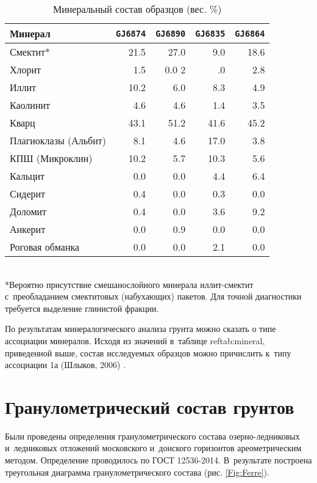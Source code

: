 \begin{table}[]
    \centering
    \small
    \caption{Минеральный состав образцов (вес. \%)} \label{tab:mineral}
    \begin{tabular}{@{}lrrrr@{}}
    \toprule
    Минерал & \texttt{GJ6874} &	\texttt{GJ6890} & \texttt{GJ6835} & \texttt{GJ6864}  \\ \midrule
    Смектит*	& 21.5	& 27.0	& 9.0	& 18.6 \\
    Хлорит	& 1.5	& 0.0	2& .0	& 2.8 \\
    Иллит	& 10.2	& 6.0	& 8.3	& 4.9 \\
    Каолинит	& 4.6	& 4.6	& 1.4	& 3.5 \\
    Кварц	& 43.1	& 51.2	& 41.6	& 45.2 \\
    Плагиоклазы (Альбит)	& 8.1	& 4.6	& 17.0	& 3.8 \\
    КПШ (Микроклин)	& 10.2	& 5.7	& 10.3	& 5.6 \\
    Кальцит	& 0.0	& 0.0	& 4.4	& 6.4 \\
    Сидерит	& 0.4	& 0.0	& 0.3	& 0.0 \\
    Доломит	& 0.4	& 0.0	& 3.6	& 9.2 \\
    Анкерит	& 0.0	& 0.9	& 0.0	& 0.0 \\
    Роговая обманка	& 0.0	& 0.0	& 2.1	& 0.0 \\ \bottomrule
    \end{tabular}
    \\ *Вероятно присутствие смешанослойного минерала иллит-смектит с~преобладанием смектитовых (набухающих) пакетов. Для точной диагностики требуется выделение глинистой фракции.
\end{table}
	
По результатам минералогического анализа грунта можно сказать о типе ассоциации минералов. 
Исходя из значений в~таблице ref{tab:mineral}, приведенной выше, состав исследуемых образцов можно причислить к~типу ассоциации 1а (Шлыков, 2006) \cite{Sh_2006}.


\section{Гранулометрический состав грунтов}

Были проведены определения гранулометрического состава озерно-ледниковых и~ледниковых отложений московского и~донского горизонтов ареометрическим методом. Определение проводилось по ГОСТ 12536-2014. В~результате построена треугольная диаграмма гранулометрического состава (рис. \ref{Fig:Ferre}).

